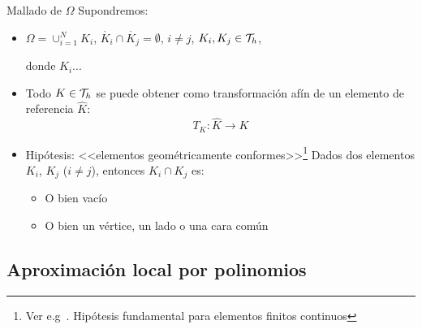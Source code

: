 \documentclass[10pt,leqno]{beamer}
\newcommand{\Nt}{N}
\newcommand{\interior}[1]{\mathring{#1}}
\newcommand{\refelem}{\widehat}
\begin{document}
\begin{frame}{Mallado de $\Omega$}
  Supondremos:
  \bigskip
  \begin{itemize}\itemsep1em
  \item  $\Omega=\cup_{i=1}^\Nt K_i$, \quad
    $\interior{K_i}\cap\interior{K_j}=\emptyset$, $i\neq j$,
    \quad $K_i,K_j\in{\cal T}_h$,
    \begin{flushright}
      \scriptsize
      donde $K_i$... 
    \end{flushright}
  \item Todo $K\in{\cal T}_h$ se puede obtener como transformación afín de un
    \alert{elemento de referencia} $\refelem K$:
    $$T_K: \refelem K \to K$$

  \item Hipótesis: <<\alert{elementos geométricamente conformes}>>\footnote{Ver e.g~\cite{Ern-Guermond:04}. Hipótesis fundamental para elementos finitos continuos}
    Dados dos elementos $K_i$, $K_j$ ($i\neq j$), entonces $K_i\cap K_j$ es:
    \begin{itemize}
    \item O bien vacío
    \item O bien un vértice, un lado o una cara común
    \end{itemize}
  \end{itemize}
\end{frame}


\subsection{Aproximación local por polinomios}
\end{document}
